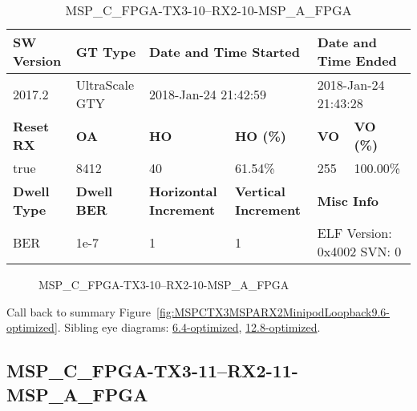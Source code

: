 \begin{table}[h]
\centering
\caption{MSP\_C\_FPGA-TX3-10--RX2-10-MSP\_A\_FPGA}
\label{tab:MSPCFPGATX310RX210MSPAFPGA9.6-optimized}
\begin{tabular}{@{}|l|l|l|l|l|l|@{}}
\toprule
\textbf{SW Version}                & \textbf{GT Type}   & \multicolumn{2}{l|}{\textbf{Date and Time Started}}            & \multicolumn{2}{l|}{\textbf{Date and Time Ended}}        \\ \midrule
2017.2                       & UltraScale GTY          & \multicolumn{2}{l|}{2018-Jan-24 21:42:59}                   & \multicolumn{2}{l|}{2018-Jan-24 21:43:28}               \\ \midrule
\textbf{Reset RX}                  & \textbf{OA} & \textbf{HO}   & \textbf{HO (\%)} & \textbf{VO} & \textbf{VO (\%)} \\ \midrule
true & 8412        & 40          & 61.54\%        & 255        & 100.00\%       \\ \midrule
\textbf{Dwell Type}                & \textbf{Dwell BER} & \textbf{Horizontal Increment} & \textbf{Vertical Increment}    & \multicolumn{2}{l|}{\textbf{Misc Info}}                  \\ \midrule
BER                            & 1e-7        & 1        & 1           & \multicolumn{2}{l|}{ELF Version: 0x4002 SVN: 0}                         \\ \bottomrule
\end{tabular}
\end{table}

\begin{figure}[h]
\caption{MSP\_C\_FPGA-TX3-10--RX2-10-MSP\_A\_FPGA} \label{fig:MSPCFPGATX310RX210MSPAFPGA9.6-optimized}
\end{figure}

Call back to summary Figure~\ref{fig:MSPCTX3MSPARX2MinipodLoopback9.6-optimized}.
Sibling eye diagrams: \hyperref[sec:MSPCFPGATX310RX210MSPAFPGA6.4-optimized]{6.4-optimized}, \hyperref[sec:MSPCFPGATX310RX210MSPAFPGA12.8-optimized]{12.8-optimized}.

\clearpage
\newpage


\subsection{MSP\_C\_FPGA-TX3-11--RX2-11-MSP\_A\_FPGA}\label{sec:MSPCFPGATX311RX211MSPAFPGA9.6-optimized}


